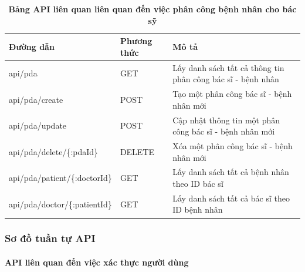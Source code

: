 \begin{enumerate}[a)]
\begin{table}[H]
  \centering
  \caption{\bfseries \fontsize{12pt}{0pt}\selectfont Bảng API liên quan liên quan đến việc phân công bệnh nhân cho bác sỹ}
  \begin{tabularx}{0.9\textwidth}{
  | >{\raggedright\arraybackslash}X
  | >{\raggedright\arraybackslash}m{2cm}
  | >{\raggedright\arraybackslash}X|
  }
  \hline
  \bfseries Đường dẫn    &\bfseries Phương thức    &\bfseries Mô tả\\ \hline
  api/pda   &   GET  & Lấy danh sách tất cả thông tin phân công bác sĩ - bệnh nhân \\ \hline
  api/pda/create  &    POST    & Tạo một phân công bác sĩ - bệnh nhân mới \\ \hline
  api/pda/update  &    POST    & Cập nhật thông tin một phân công bác sĩ - bệnh nhân mới \\ \hline
  api/pda/delete/\{:pdaId\}  &    DELETE    & Xóa một phân công bác sĩ - bệnh nhân mới \\ \hline
  api/pda/patient/\{:doctorId\} &  GET  & Lấy danh sách tất cả bệnh nhân theo ID bác sĩ \\ \hline
  api/pda/doctor/\{:patientId\} &  GET  & Lấy danh sách tất cả bác sĩ theo ID bệnh nhân \\ \hline


  \end{tabularx}
  \label{table_api_pda}
\end{table}



\end{enumerate}




\subsubsection{Sơ đồ tuần tự API}



\paragraph{API liên quan đến việc xác thực người dùng}
\mbox{}

